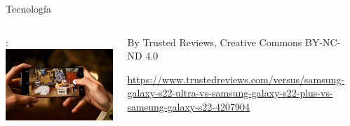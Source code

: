 \begin{frame}[t]{Tecnología}
\begin{columns}[T]
: \\
\includegraphics[height=.6\textheight]{images/samsung-s22.jpg}\\
\begin{tiny}
By Trusted Reviews, Creative Commons BY-NC-ND 4.0\\
{\begin{spacing}{1.0}
\url{https://www.trustedreviews.com/versus/samsung-galaxy-s22-ultra-vs-samsung-galaxy-s22-plus-vs-samsung-galaxy-s22-4207904}
\end{spacing}}
\end{tiny}

\\

\end{columns}

\end{frame}


